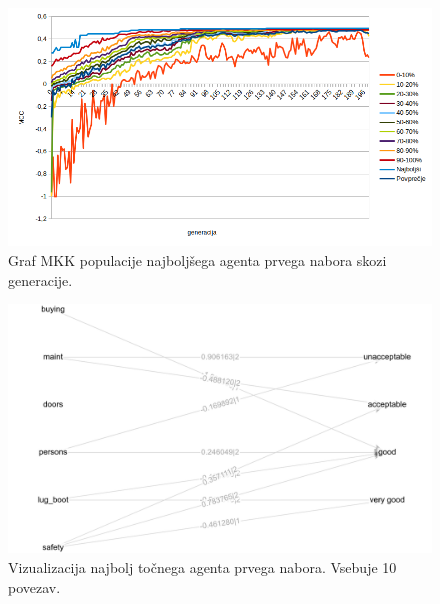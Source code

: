 \begin{figure}[H]
    \begin{center}
        \includegraphics[width=13cm]{car/1/mcc}
    \end{center}
    \caption{Graf MKK populacije najboljšega agenta prvega nabora skozi generacije.}
    \label{fig:car_mcc_1}
\end{figure}

\begin{figure}[H]
    \begin{center}
        \includegraphics[width=13cm]{car/1/acc_g}
    \end{center}
    \caption{Vizualizacija najbolj točnega agenta prvega nabora. Vsebuje 10 povezav.}
    \label{fig:car_acc_1_g}
\end{figure}

